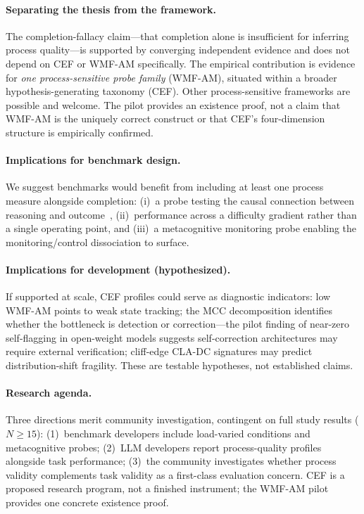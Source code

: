 \documentclass{article}
\begin{document}
\paragraph{Separating the thesis from the framework.}
The completion-fallacy claim---that completion alone is insufficient for
inferring process quality---is supported by converging independent
evidence and does not depend on CEF or WMF-AM specifically. The
empirical contribution is evidence for \emph{one process-sensitive probe
family} (WMF-AM), situated within a broader hypothesis-generating
taxonomy (CEF). Other process-sensitive frameworks are possible and
welcome. The pilot provides an existence proof, not a claim that WMF-AM
is the uniquely correct construct or that CEF's four-dimension structure
is empirically confirmed.

\paragraph{Implications for benchmark design.}
We suggest benchmarks would benefit from including at least one process
measure alongside completion: (i)~a probe testing the causal connection
between reasoning and outcome~\citep{aravindan2026fragile,lightman2023verify},
(ii)~performance across a difficulty gradient rather than a single
operating point, and (iii)~a metacognitive monitoring probe enabling
the monitoring/control dissociation to surface.

\paragraph{Implications for development (hypothesized).}
If supported at scale, CEF profiles could serve as diagnostic indicators:
low WMF-AM points to weak state tracking; the MCC decomposition
identifies whether the bottleneck is detection or correction---the
pilot finding of near-zero self-flagging in open-weight models suggests
self-correction architectures may require external verification;
cliff-edge CLA-DC signatures may predict distribution-shift fragility.
These are testable hypotheses, not established claims.

\paragraph{Research agenda.}
Three directions merit community investigation, contingent on full study
results ($N \geq 15$): (1)~benchmark developers include load-varied
conditions and metacognitive probes; (2)~LLM developers report
process-quality profiles alongside task performance; (3)~the community
investigates whether process validity complements task validity as a
first-class evaluation concern.
CEF is a proposed research program, not a finished instrument; the
WMF-AM pilot provides one concrete existence proof.
\end{document}
